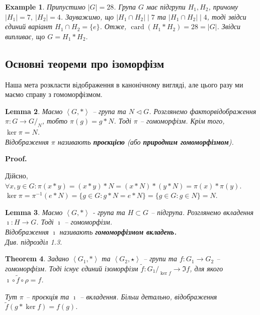 \documentclass[a4paper, 10pt]{article}
\makeatletter
\theoremstyle{theoremdd}
\newtheorem{theorem}{Theorem}[subsection]
\theoremstyle{theoremdd}
\theoremstyle{theoremdd}
\theoremstyle{theoremdd}
\theoremstyle{theoremdd}
\newtheorem{example}[theorem]{Example}
\theoremstyle{theoremdd}
\theoremstyle{theoremdd}
\theoremstyle{theoremdd}
\theoremstyle{theoremdd}
\theoremstyle{theoremdd}
\theoremstyle{theoremdd}
\theoremstyle{theoremdd}
\theoremstyle{theoremdd}
\newtheorem{lemma}[theorem]{Lemma}
\theoremstyle{theoremdd}
\theoremstyle{theoremdd}
\renewenvironment{proof}[1][Proof.\\]{\par
\pushQED{\hfill \qed}%
\normalfont \topsep6\p@\@plus6\p@\relax
\trivlist
\item\relax
{\bfseries
#1\@addpunct{.}}\hspace\labelsep\ignorespaces
}{%
\popQED\endtrivlist\@endpefalse
}
\DeclareMathOperator{\card}{card}
\makeatother
\begin{document}
\begin{example}
Припустимо $|G| = 28$. Група $G$ має підгрупи $H_1,H_2$, причому $|H_1| = 7,\ |H_2| = 4$. Зауважимо, що $|H_1 \cap H_2| \mid 7$ та $|H_1 \cap H_2| \mid 4$, тоді звідси єдиний варіант $H_1 \cap H_2 = \{e\}$. Отже, $\card(H_1*H_2) = 28 = |G|$. Звідси випливає, що $G = H_1*H_2$.
\end{example}

\subsection{Основні теореми про ізоморфізм}
Наша мета розкласти відображення в канонічному вигляді, але цього разу ми маємо справу з гомоморфізмом.
\begin{lemma}
Маємо $\left< G, *\right>$ -- група та $N \triangleleft G$. Розглянемо факторвідображення $\pi \colon G \to G/_{N}$, тобто $\pi(g) = g*N$. Тоді $\pi$ -- гомоморфізм. Крім того, $\ker \pi = N$.\\
Відображення $\pi$ називають \textbf{проєкцією} (або \textbf{природним гомоморфізмом}).
\end{lemma}

\begin{proof}
Дійсно, $\forall x,y \in G: \pi(x*y) = (x*y)*N = (x*N)*(y*N) = \pi(x) * \pi(y)$.\\
$\ker \pi = \pi^{-1}(e*N) = \{g \in G: g*N = e*N\} = \{g \in G: g \in N\} = N$.
\end{proof}

\begin{lemma}
Маємо $\left<G, *\right>$ - група та $H \subset G$ -- підгрупа. Розглянемо вкладення $\imath \colon H \to G$. Тоді $\imath$ -- гомоморфізм.\\
Відображення $\imath$ називають \textbf{гомоморфізмом вкладень.}\\
\textit{Див. підрозділ 1.3.}
\end{lemma}

\begin{theorem}
Задано $\left<G_1, * \right>$ та $\left<G_2, \star \right>$ -- групи та $f \colon G_1 \to G_2$ -- гомоморфізм. Тоді існує єдиний ізоморфізм $\tilde{f} \colon G_1/_{\ker f} \to \Im f$, для якого $\imath \circ \tilde{f} \circ \rho = f$.
\begin{figure}[H]
\centering
{}
\end{figure}
Тут $\pi$ -- проєкція та $\imath$ -- вкладення. Більш детально, відображення $\tilde{f}(g*\ker f) = f(g)$.
\end{theorem}
\end{document}
